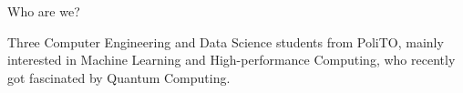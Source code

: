 \graphicspath{{assets/whoarewe/}} 

\begin{frame}{Who are we?}
	\begin{figure}[!h]
	    \captionsetup[subfloat]{labelformat=empty} %
		\centering	
		  \quad
		  \quad
	\end{figure}

	Three Computer Engineering and Data Science students from \alert{PoliTO}, 
	mainly interested in Machine Learning and High-performance Computing, 
	who recently got fascinated by \alert{Quantum Computing}.
\end{frame}

